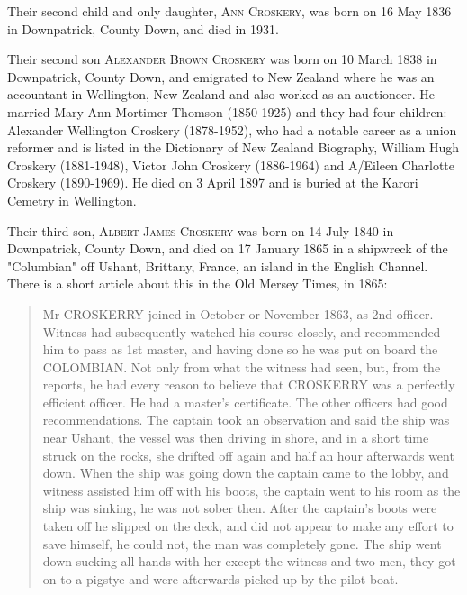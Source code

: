 Their second child and only daughter, \textsc{Ann Croskery}, was born on 16 May 1836 in Downpatrick, County Down, and died in 1931. 

Their second son \textsc{Alexander Brown Croskery} was born on 10 March 1838 in	Downpatrick, County Down, and emigrated to New Zealand where he was an accountant in Wellington, New Zealand and also worked as an auctioneer.  He married Mary Ann Mortimer Thomson (1850-1925) and they had four children: Alexander Wellington Croskery (1878-1952), who had a notable career as a union reformer and is listed in the Dictionary of New Zealand Biography,  William Hugh Croskery (1881-1948), Victor John Croskery (1886-1964) and A/Eileen Charlotte Croskery (1890-1969). He died on 3 April 1897 and is buried at the Karori Cemetry in Wellington.

Their third son, \textsc{Albert James Croskery} was born on	14 July 1840 in	Downpatrick, County Down, and died on 17 January 1865 in a shipwreck of the "Columbian" off Ushant, Brittany, France, an island in the English Channel. There is a short article about this in the Old Mersey Times, in 1865:
\begin{quotation}
Mr CROSKERRY joined in October or November 1863, as 2nd officer. Witness had subsequently watched his course closely, and recommended him to pass as 1st master, and having done so he was put on board the COLOMBIAN. Not only from what the witness had seen, but, from the reports, he had every reason to believe that CROSKERRY was a perfectly efficient officer. He had a master's certificate. The other officers had good recommendations.
The captain took an observation and said the ship was near Ushant, the vessel was then driving in shore, and in a short time struck on the rocks, she drifted off again and half an hour afterwards went down. When the ship was going down the captain came to the lobby, and witness assisted him off with his boots, the captain went to his room as the ship was sinking, he was not sober then. After the captain's boots were taken off he slipped on the deck, and did not appear to make any effort to save himself, he could not, the man was completely gone. The ship went down sucking all hands with her except the witness and two men, they got on to a pigstye and were afterwards picked up by the pilot boat.
\end{quotation}

